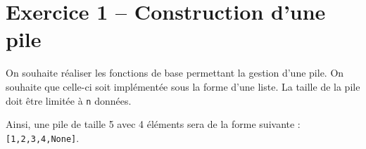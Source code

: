 %    
%
%
%
%
%
%
%
%
%
%
%
%
%
%
%
%
%
%
%
%
%
%
%
%
%
\section*{Exercice 1 -- Construction d'une pile}
On souhaite réaliser les fonctions de base permettant la gestion d'une pile. On souhaite que celle-ci soit implémentée sous la forme d'une liste. La taille de la pile doit être limitée à \texttt{n} données.

Ainsi, une pile de taille 5 avec 4 éléments sera de la forme suivante : \texttt{[1,2,3,4,None]}.

